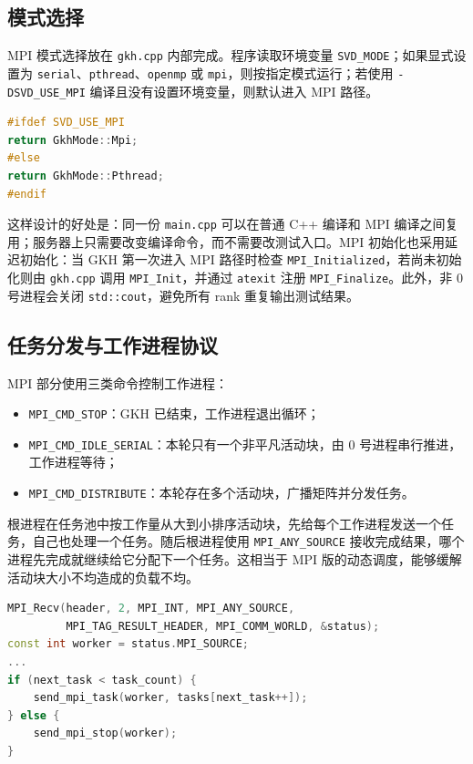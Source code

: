 \documentclass[UTF8,a4paper,10pt,fontset=windows]{ctexart}
\begin{document}
\subsection{模式选择}
MPI 模式选择放在 \texttt{gkh.cpp} 内部完成。程序读取环境变量 \texttt{SVD\_MODE}；如果显式设置为 \texttt{serial}、\texttt{pthread}、\texttt{openmp} 或 \texttt{mpi}，则按指定模式运行；若使用 \texttt{-DSVD\_USE\_MPI} 编译且没有设置环境变量，则默认进入 MPI 路径。

\begin{lstlisting}[language=C++]
#ifdef SVD_USE_MPI
return GkhMode::Mpi;
#else
return GkhMode::Pthread;
#endif
\end{lstlisting}

这样设计的好处是：同一份 \texttt{main.cpp} 可以在普通 C++ 编译和 MPI 编译之间复用；服务器上只需要改变编译命令，而不需要改测试入口。MPI 初始化也采用延迟初始化：当 GKH 第一次进入 MPI 路径时检查 \texttt{MPI\_Initialized}，若尚未初始化则由 \texttt{gkh.cpp} 调用 \texttt{MPI\_Init}，并通过 \texttt{atexit} 注册 \texttt{MPI\_Finalize}。此外，非 0 号进程会关闭 \texttt{std::cout}，避免所有 rank 重复输出测试结果。

\subsection{任务分发与工作进程协议}
MPI 部分使用三类命令控制工作进程：

\begin{itemize}
  \item \texttt{MPI\_CMD\_STOP}：GKH 已结束，工作进程退出循环；
  \item \texttt{MPI\_CMD\_IDLE\_SERIAL}：本轮只有一个非平凡活动块，由 0 号进程串行推进，工作进程等待；
  \item \texttt{MPI\_CMD\_DISTRIBUTE}：本轮存在多个活动块，广播矩阵并分发任务。
\end{itemize}

根进程在任务池中按工作量从大到小排序活动块，先给每个工作进程发送一个任务，自己也处理一个任务。随后根进程使用 \texttt{MPI\_ANY\_SOURCE} 接收完成结果，哪个进程先完成就继续给它分配下一个任务。这相当于 MPI 版的动态调度，能够缓解活动块大小不均造成的负载不均。

\begin{lstlisting}[language=C++]
MPI_Recv(header, 2, MPI_INT, MPI_ANY_SOURCE,
         MPI_TAG_RESULT_HEADER, MPI_COMM_WORLD, &status);
const int worker = status.MPI_SOURCE;
...
if (next_task < task_count) {
    send_mpi_task(worker, tasks[next_task++]);
} else {
    send_mpi_stop(worker);
}
\end{lstlisting}
\end{document}
